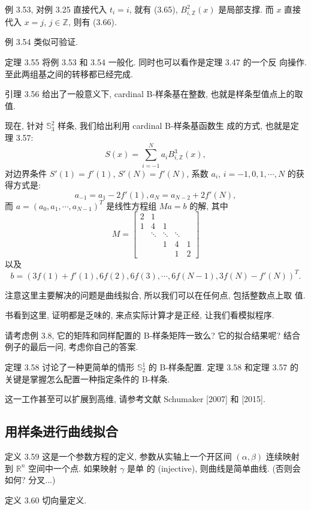 \documentclass[a4paper]{ctexart}
\begin{document}
例 3.53, 对例 3.25 直接代入 $t_i = i$, 就有 (3.65), $B_{i,
  \mathbb{Z}}^2(x)$ 是局部支撑. 而 $x$ 直接代入 $x = j$, $j \in
\mathbb{Z}$, 则有 (3.66).

例 3.54 类似可验证.

定理 3.55 将例 3.53 和 3.54 一般化. 同时也可以看作是定理 3.47 的一个反
向操作. 至此两组基之间的转移都已经完成.

引理 3.56 给出了一般意义下, cardinal B-样条基在整数, 也就是样条型值点上的取值.

现在, 针对 $\mathbb{S}_3^2$ 样条, 我们给出利用 cardinal B-样条基函数生
成的方式, 也就是定理 3.57:
$$
S(x) = \sum_{i = -1}^N a_i B_{i, \mathbb{Z}}^3(x),
$$
对边界条件 $S'(1) = f'(1)$, $S'(N) = f'(N)$,
系数 $a_i$, $i = -1, 0, 1, \cdots, N$ 的获得方式是:
$$
a_{-1} = a_1 - 2 f'(1), a_N = a_{N - 2} + 2 f'(N),
$$
而 $a = (a_0, a_1, \cdots, a_{N - 1})^T$ 是线性方程组 $M a = b$ 的解, 其中
$$
M = \left[
  \begin{array}{ccccc}
    2 & 1 &&& \\
    1 & 4 & 1 &&\\
    & \ddots & \ddots & \ddots & \\
    && 1 & 4 & 1\\
    &&& 1 & 2
  \end{array}
  \right]
$$
以及
$$
b = \left(3 f(1) + f'(1), 6 f(2), 6 f (3), \cdots, 6 f(N - 1), 3
f(N) - f'(N) \right)^T.
$$

注意这里主要解决的问题是曲线拟合, 所以我们可以在任何点, 包括整数点上取
值.

书看到这里, 证明都是乏味的, 来点实际计算才是正经, 让我们看模拟程序.

请考虑例 3.8, 它的矩阵和同样配置的 B-样条矩阵一致么? 它的拟合结果呢?
结合例子的最后一问, 考虑你自己的答案.

定理 3.58 讨论了一种更简单的情形 $\mathbb{S}_2^1$ 的 B-样条配置. 定理
3.58 和定理 3.57 的关键是掌握怎么配置一种指定条件的 B-样条.

这一工作甚至可以扩展到高维, 请参考文献 Schumaker [2007] 和 [2015].

\subsection{用样条进行曲线拟合}

定义 3.59 这是一个参数方程的定义, 参数从实轴上一个开区间 $(\alpha,
\beta)$ 连续映射到 $\mathbb{R}^n$ 空间中一个点. 如果映射 $\gamma$ 是单
的 (injective), 则曲线是简单曲线. (否则会如何? 分叉...)

定义 3.60 切向量定义.
\end{document}

